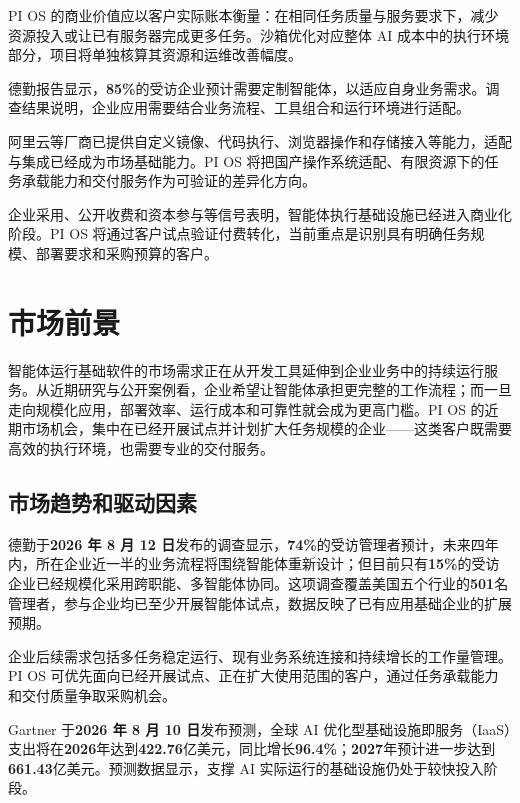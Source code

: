 PI OS 的商业价值应以客户实际账本衡量：在相同任务质量与服务要求下，减少资源投入或让已有服务器完成更多任务。沙箱优化对应整体 AI 成本中的执行环境部分，项目将单独核算其资源和运维改善幅度。

德勤报告显示，\textbf{85\%}的受访企业预计需要定制智能体，以适应自身业务需求。调查结果说明，企业应用需要结合业务流程、工具组合和运行环境进行适配。

阿里云等厂商已提供自定义镜像、代码执行、浏览器操作和存储接入等能力，适配与集成已经成为市场基础能力。PI OS 将把国产操作系统适配、有限资源下的任务承载能力和交付服务作为可验证的差异化方向。

企业采用、公开收费和资本参与等信号表明，智能体执行基础设施已经进入商业化阶段。PI OS 将通过客户试点验证付费转化，当前重点是识别具有明确任务规模、部署要求和采购预算的客户。

\section{市场前景}\label{sec:4.2}
智能体运行基础软件的市场需求正在从开发工具延伸到企业业务中的持续运行服务。从近期研究与公开案例看，企业希望让智能体承担更完整的工作流程；而一旦走向规模化应用，部署效率、运行成本和可靠性就会成为更高门槛。PI OS 的近期市场机会，集中在已经开展试点并计划扩大任务规模的企业------这类客户既需要高效的执行环境，也需要专业的交付服务。

\subsection{市场趋势和驱动因素}\label{sec:4.2.1}
德勤于\textbf{2026 年 8 月 12 日}发布的调查显示，\textbf{74\%}的受访管理者预计，未来四年内，所在企业近一半的业务流程将围绕智能体重新设计；但目前只有\textbf{15\%}的受访企业已经规模化采用跨职能、多智能体协同。这项调查覆盖美国五个行业的\textbf{501}名管理者，参与企业均已至少开展智能体试点，数据反映了已有应用基础企业的扩展预期。

企业后续需求包括多任务稳定运行、现有业务系统连接和持续增长的工作量管理。PI OS 可优先面向已经开展试点、正在扩大使用范围的客户，通过任务承载能力和交付质量争取采购机会。

Gartner 于\textbf{2026 年 8 月 10 日}发布预测，全球 AI 优化型基础设施即服务（IaaS）支出将在\textbf{2026}年达到\textbf{422.76}亿美元，同比增长\textbf{96.4\%}；\textbf{2027}年预计进一步达到\textbf{661.43}亿美元。预测数据显示，支撑 AI 实际运行的基础设施仍处于较快投入阶段。

